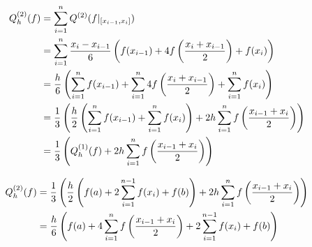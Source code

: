 \begin{align*}
    Q_h^{(2)}(f)
    & = \sum_{i=1}^n Q^{(2)}(f|_{[x_{i-1}, x_i]}) \\
    & = \sum_{i=1}^n
        \frac{x_i - x_{i-1}}{6}
        \left ( 
            f(x_{i-1}) +
            4 f \left ( \frac{x_i + x_{i-1}}{2} \right ) +
            f(x_i)
         \right ) \\
    & = \frac{h}{6}
        \left ( 
            \sum_{i=1}^n f(x_{i-1}) +
            \sum_{i=1}^n 4 f \left ( \frac{x_i + x_{i-1}}{2} \right ) +
            \sum_{i=1}^n f(x_i)
         \right ) \\
    & = \frac{1}{3}
        \left ( 
            \frac{h}{2}
            \left ( 
                \sum_{i=1}^n f(x_{i-1}) +
                \sum_{i=1}^n f(x_i)
             \right ) +
            2h \sum_{i=1}^n f \left ( \frac{x_{i-1} + x_i}{2} \right )
         \right ) \\
    & = \frac{1}{3}
        \left ( 
            Q_h^{(1)}(f) +
            2h \sum_{i=1}^n f \left ( \frac{x_{i-1} + x_i}{2} \right )
         \right )
\end{align*}

\begin{align*}
    Q_h^{(2)}(f)
    & = \frac{1}{3}
        \left ( 
            \frac{h}{2}
            \left ( 
                f(a) +
                2 \sum_{i=1}^{n-1} f(x_i) +
                f(b)
             \right ) +
            2h \sum_{i=1}^n f \left ( \frac{x_{i-1} + x_i}{2} \right )
         \right ) \\
    & = \frac{h}{6}
        \left ( 
            f(a) +
            4 \sum_{i=1}^n f \left ( \frac{x_{i-1} + x_i}{2} \right ) +
            2 \sum_{i=1}^{n-1} f(x_i) +
            f(b)
         \right )
\end{align*}